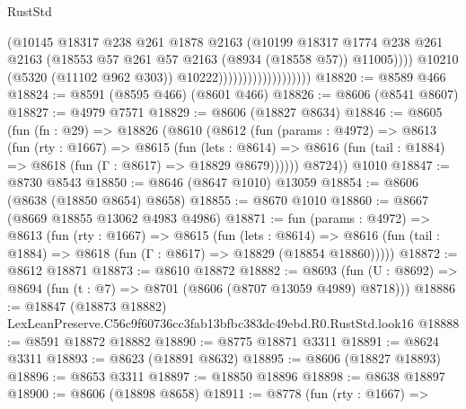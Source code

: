 \begin{lexlean}{RustStd}
\begin{coremodule}
                                            (@10145
                                              @18317
                                              @238
                                              @261
                                              @1878
                                              @2163
                                              (@10199
                                                @18317
                                                @1774
                                                @238
                                                @261
                                                @2163
                                                (@18553
                                                  @57
                                                  @261
                                                  @57
                                                  @2163
                                                  (@8934 (@18558 @57))
                                                  @11005))))
                                          @10210
                                          (@5320 (@11102 @962 @303))
                                          @10222)))))))))))))))))))
@18820 := @8589 @466
@18824 := @8591 (@8595 @466) (@8601 @466)
@18826 := @8606 (@8541 @8607)
@18827 := @4979 @7571
@18829 := @8606 (@18827 @8634)
@18846 := @8605
    (fun (fn : @29) =>
    @18826
      (@8610
        (@8612
          (fun (params : @4972) =>
          @8613
            (fun (rty : @1667) =>
            @8615
              (fun (lets : @8614) =>
              @8616 (fun (tail : @1884) => @8618 (fun (Γ : @8617) => @18829 @8679))))))
        @8724))
    @1010
@18847 := @8730 @8543
@18850 := @8646 (@8647 @1010) @13059
@18854 := @8606 (@8638 (@18850 @8654) @8658)
@18855 := @8670 @1010
@18860 := @8667 (@8669 @18855 @13062 @4983 @4986)
@18871 := fun (params : @4972) =>
  @8613
    (fun (rty : @1667) =>
    @8615
      (fun (lets : @8614) =>
      @8616 (fun (tail : @1884) => @8618 (fun (Γ : @8617) => @18829 (@18854 @18860)))))
@18872 := @8612 @18871
@18873 := @8610 @18872
@18882 := @8693
    (fun (U : @8692) => @8694 (fun (t : @7) => @8701 (@8606 (@8707 @13059 @4989) @8718)))
@18886 := @18847 (@18873 @18882) LexLeanPreserve.C56c9f60736cc3fab13bfbc383dc49ebd.R0.RustStd.look16
@18888 := @8591 @18872 @18882
@18890 := @8775 @18871 @3311
@18891 := @8624 @3311
@18893 := @8623 (@18891 @8632)
@18895 := @8606 (@18827 @18893)
@18896 := @8653 @3311
@18897 := @18850 @18896
@18898 := @8638 @18897
@18900 := @8606 (@18898 @8658)
@18911 := @8778
    (fun (rty : @1667) =>

\end{coremodule}
\end{lexlean}
